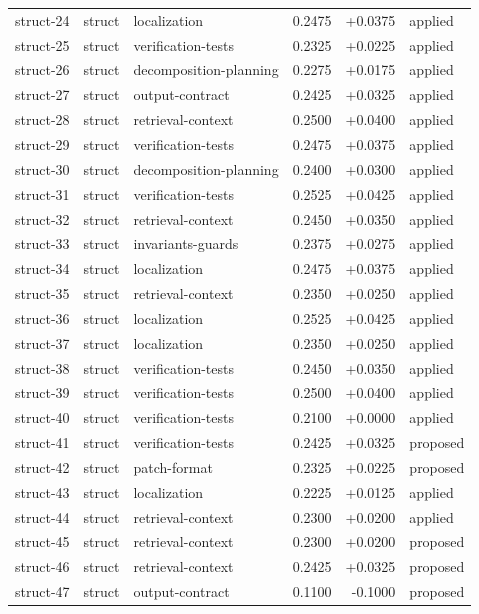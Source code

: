 \begin{center}
\begin{longtable}{llp{5.2cm}rrl}
struct-24 & struct & localization & 0.2475 & +0.0375 & applied \\
struct-25 & struct & verification-tests & 0.2325 & +0.0225 & applied \\
struct-26 & struct & decomposition-planning & 0.2275 & +0.0175 & applied \\
struct-27 & struct & output-contract & 0.2425 & +0.0325 & applied \\
struct-28 & struct & retrieval-context & 0.2500 & +0.0400 & applied \\
struct-29 & struct & verification-tests & 0.2475 & +0.0375 & applied \\
struct-30 & struct & decomposition-planning & 0.2400 & +0.0300 & applied \\
struct-31 & struct & verification-tests & 0.2525 & +0.0425 & applied \\
struct-32 & struct & retrieval-context & 0.2450 & +0.0350 & applied \\
struct-33 & struct & invariants-guards & 0.2375 & +0.0275 & applied \\
struct-34 & struct & localization & 0.2475 & +0.0375 & applied \\
struct-35 & struct & retrieval-context & 0.2350 & +0.0250 & applied \\
struct-36 & struct & localization & 0.2525 & +0.0425 & applied \\
struct-37 & struct & localization & 0.2350 & +0.0250 & applied \\
struct-38 & struct & verification-tests & 0.2450 & +0.0350 & applied \\
struct-39 & struct & verification-tests & 0.2500 & +0.0400 & applied \\
struct-40 & struct & verification-tests & 0.2100 & +0.0000 & applied \\
struct-41 & struct & verification-tests & 0.2425 & +0.0325 & proposed \\
struct-42 & struct & patch-format & 0.2325 & +0.0225 & proposed \\
struct-43 & struct & localization & 0.2225 & +0.0125 & applied \\
struct-44 & struct & retrieval-context & 0.2300 & +0.0200 & applied \\
struct-45 & struct & retrieval-context & 0.2300 & +0.0200 & proposed \\
struct-46 & struct & retrieval-context & 0.2425 & +0.0325 & proposed \\
struct-47 & struct & output-contract & 0.1100 & -0.1000 & proposed \\

\end{longtable}
\end{center}
